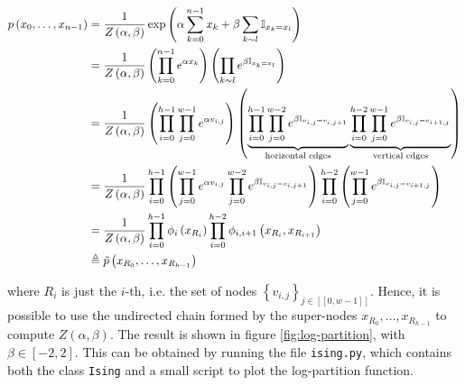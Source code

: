 \documentclass[a4paper, 11pt]{report}
\begin{document}
\begin{enumerate}[resume]
    \begin{equation*}
        \begin{aligned}
        p \left( x_0, \dots, x_{n-1} \right) &= \frac{1}{Z \left( \alpha, \beta \right)} \exp \left( \alpha \sum_{k=0}^{n-1} x_k + \beta \sum_{k \sim l} \mathbb{I}_{x_k = x_l} \right) \\
        &= \frac{1}{Z \left( \alpha, \beta \right)} \left( \prod_{k=0}^{n-1} e^{\alpha x_k} \right) \left( \prod_{k \sim l} e^{\beta \mathbb{I}_{x_k = x_l}} \right) \\
        &= \frac{1}{Z \left( \alpha, \beta \right)} \left( \prod_{i=0}^{h-1} \prod_{j=0}^{w-1} e^{\alpha v_{i, j}} \right) \left( \underbrace{\prod_{i=0}^{h-1} \prod_{j=0}^{w-2} e^{\beta \mathbb{I}_{v_{i, j} = v_{i, j+1}}}}_{\text{horizontal edges}} \underbrace{\prod_{i=0}^{h-2} \prod_{j=0}^{w-1} e^{\beta \mathbb{I}_{v_{i, j} = v_{i+1, j}}}}_{\text{vertical edges}} \right) \\
        &= \frac{1}{Z \left( \alpha, \beta \right)} \prod_{i=0}^{h-1} \left( \prod_{j=0}^{w-1} e^{\alpha v_{i, j}} \prod_{j=0}^{w-2} e^{\beta \mathbb{I}_{v_{i, j} = v_{i, j+1}}} \right) \prod_{i=0}^{h-2} \left( \prod_{j=0}^{w-1} e^{\beta \mathbb{I}_{v_{i, j} = v_{i+1, j}}} \right) \\
        &= \frac{1}{Z \left( \alpha, \beta \right)} \prod_{i=0}^{h-1} \phi_{i} \left( x_{R_i} \right) \prod_{i=0}^{h-2} \phi_{i, i+1} \left( x_{R_i}, x_{R_{i+1}} \right) \\
        &\triangleq \Tilde{p} \left( x_{R_0}, \dots, x_{R_{h-1}} \right)
        \end{aligned}
    \end{equation*}

    where $R_i$ is just the $i$-th, i.e. the set of nodes $\left\{ v_{i, j} \right\}_{j \in [\![ 0, w-1 ]\!]}$. Hence, it is possible to use the undirected chain formed by the super-nodes $x_{R_0}, \dots, x_{R_{h-1}}$ to compute $Z \left( \alpha, \beta \right)$. The result is shown in figure \ref{fig:log-partition}, with $\beta \in [-2, 2]$. This can be obtained by running the file \texttt{ising.py}, which contains both the class \texttt{Ising} and a small script to plot the log-partition function.
    

\end{enumerate}
\end{document}
